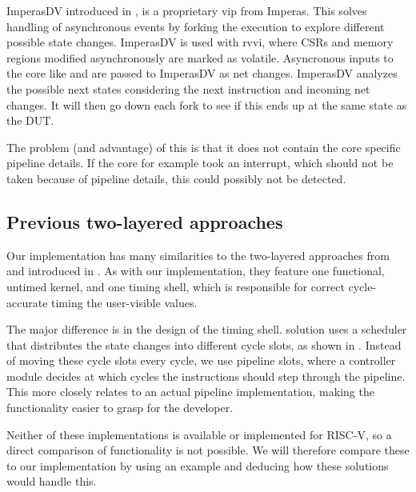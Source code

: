 ImperasDV introduced in , is a proprietary \acrfull{vip} from Imperas. This solves handling of asynchronous events by forking the execution to explore different possible state changes. ImperasDV is used with \acrshort{rvvi}, where CSRs and memory regions modified asynchronously are marked as volatile. Asyncronous inputs to the core like  and  are passed to ImperasDV as net changes. ImperasDV analyzes the possible next states considering the next instruction and incoming net changes. It will then go down each fork to see if this ends up at the same state as the DUT. 

The problem (and advantage) of this is that it does not contain the core specific pipeline details. If the core for example took an interrupt, which should not be taken because of pipeline details, this could possibly not be detected. 



\subsection{Previous two-layered approaches}

Our implementation has many similarities to the two-layered approaches from \textcite{leeFaCSimFastCycleAccurate2008} and \textcite{chiangEfficientTwolayeredCycleaccurate2009} introduced in . As with our implementation, they feature one functional, untimed kernel, and one timing shell, which is responsible for correct cycle-accurate timing the user-visible values. 

The major difference is in the design of the timing shell. \textcite{chiangEfficientTwolayeredCycleaccurate2009} solution uses a scheduler that distributes the state changes into different cycle slots, as shown in . Instead of moving these cycle slots every cycle, we use pipeline slots, where a controller module decides at which cycles the instructions should step through the pipeline. This more closely relates to an actual pipeline implementation, making the functionality easier to grasp for the developer.

Neither of these implementations is available or implemented for RISC-V, so a direct comparison of functionality is not possible. We will therefore compare these to our implementation by using an example and deducing how these solutions would handle this. 



